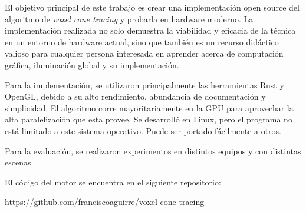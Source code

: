 \documentclass{prgrado}
\begin{document}
El objetivo principal de este trabajo es crear una implementación open source del algoritmo de \textit{voxel cone tracing} y probarla en hardware moderno. La implementación realizada no solo demuestra la viabilidad y eficacia de la técnica en un entorno de hardware actual, sino que también es un recurso didáctico valioso para cualquier persona interesada en aprender acerca de computación gráfica, iluminación global y su implementación.

Para la implementación, se utilizaron principalmente las herramientas Rust y OpenGL, debido a su alto rendimiento, abundancia de documentación y simplicidad.
El algoritmo corre mayoritariamente en la GPU para aprovechar la alta paralelización que esta provee.
Se desarrolló en Linux, pero el programa no está limitado a este sistema operativo.
Puede ser portado fácilmente a otros.

Para la evaluación, se realizaron experimentos en distintos equipos y con distintas escenas.

El código del motor se encuentra en el siguiente repositorio:

\url{https://github.com/franciscoaguirre/voxel-cone-tracing}

\hfill \break
{}


\tableofcontents
\newpage



\mainmatter %













\backmatter %


\newpage

\printbibliography



\begin{appendix}



\end{appendix}

\end{document}
